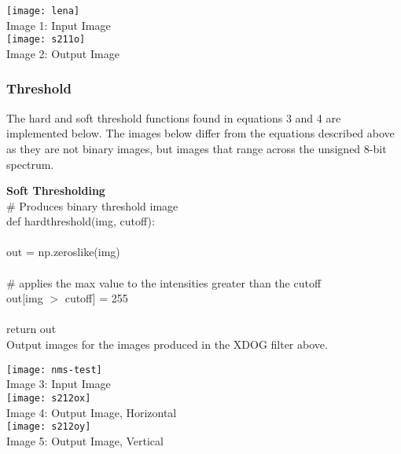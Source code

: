 \documentclass{article}
\begin{document}
	\begin{center}
		\noindent \texttt{[image: lena]}\\
		Image 1: Input Image\\
			
		\texttt{[image: s211o]}\\
		Image 2: Output Image\\
	\end{center}

	\subsubsection{Threshold}
		
	The hard and soft threshold functions found in equations 3 and 4 are implemented below. The images below differ from the equations described above as they are not binary images, but images that range across the unsigned 8-bit spectrum.\\
		
	\smallskip	
	
	\noindent \textbf{Soft Thresholding}\\
		
	\noindent \# Produces binary threshold image\\
	\noindent def hard\textunderscore threshold(img, cutoff):\\
	\\
	\indent out = np.zeros\textunderscore like(img)\\
	\\
	\indent \# applies the max value to the intensities greater than the cutoff\\
	\indent out[img $>$ cutoff] = 255\\
	\\	
	\indent return out\\
	
	Output images for the images produced in the XDOG filter above.\\
	
	\begin{center}
		\noindent \texttt{[image: nms-test]}\\
		Image 3: Input Image\\
		
		\texttt{[image: s212ox]}\\
		Image 4: Output Image, Horizontal\\
		
		\texttt{[image: s212oy]}\\
		Image 5: Output Image, Vertical\\
	\end{center}
	
\end{document}
